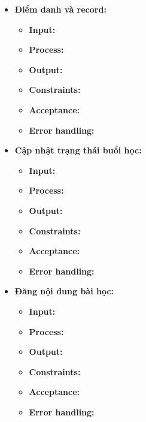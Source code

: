 \begin{itemize}
    \item \textbf{Điểm danh và record:}
    \begin{itemize}
        \item \textbf{Input:}
        \item \textbf{Process:}
        \item \textbf{Output:}
        \item \textbf{Constraints:}
        \item \textbf{Acceptance:}
        \item \textbf{Error handling:}
    \end{itemize}
    
    \item \textbf{Cập nhật trạng thái buổi học:}
    \begin{itemize}
        \item \textbf{Input:}
        \item \textbf{Process:}
        \item \textbf{Output:}
        \item \textbf{Constraints:}
        \item \textbf{Acceptance:}
        \item \textbf{Error handling:}
    \end{itemize}
    \item \textbf{Đăng nội dung bài học:}
    \begin{itemize}
        \item \textbf{Input:}
        \item \textbf{Process:}
        \item \textbf{Output:}
        \item \textbf{Constraints:}
        \item \textbf{Acceptance:}
        \item \textbf{Error handling:}
    \end{itemize}
\end{itemize}


